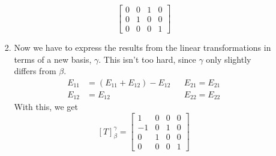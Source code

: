 \documentclass[12pt]{article}
\begin{document}
\begin{enumerate}
\begin{enumerate}
\begin{enumerate}
\[\begin{bmatrix}
                                                0 & 0 & 1 & 0 \\
                                                0 & 1 & 0 & 0 \\
                                                0 & 0 & 0 & 1
                                          \end{bmatrix}\]
                              \item Now we have to express the results from the linear transformations in terms of a new basis, $\gamma$.
                                    This isn't too hard, since $\gamma$ only slightly differs from $\beta$.
                                    \begin{align*}
                                          E_{11} & =(E_{11}+E_{12})-E_{12} &  & E_{21}=E_{21} \\
                                          E_{12} & =E_{12}                 &  & E_{22}=E_{22}
                                    \end{align*}
                                    With this, we get
                                    \[[T]^\gamma_\beta=\begin{bmatrix}
                                                1  & 0 & 0 & 0 \\
                                                -1 & 0 & 1 & 0 \\
                                                0  & 1 & 0 & 0 \\
                                                0  & 0 & 0 & 1
                                          \end{bmatrix}\]
                        \end{enumerate}
            \end{enumerate}
\end{enumerate}
\end{document}
